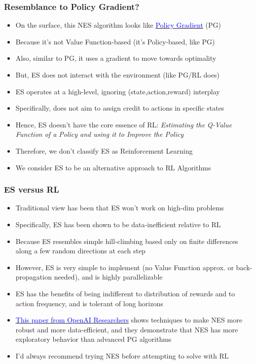 \documentclass[handout]{beamer}
\begin{document}
\begin{frame}
\frametitle{Resemblance to Policy Gradient?}
\begin{itemize}
\item On the surface, this NES algorithm looks like \href{https://github.com/coverdrive/technical-documents/blob/master/finance/cme241/PolicyGradient.pdf}{\underline{\textcolor{blue}{Policy Gradient}}} (PG)
\item Because it's not Value Function-based (it's Policy-based, like PG)
\item Also, similar to PG, it uses a gradient to move towards optimality
\item But, ES does not interact with the environment (like PG/RL does)
\item ES operates at a high-level, ignoring (state,action,reward) interplay
\item Specifically, does not aim to assign credit to actions in specific states
\item Hence, ES doesn't have the core essence of RL: {\em Estimating the Q-Value Function of a Policy and using it to Improve the Policy}
\item Therefore, we don't classify ES as Reinforcement Learning
\item We consider ES to be an alternative approach to RL Algorithms
\end{itemize}
\end{frame}

\begin{frame}
\frametitle{ES versus RL}
\begin{itemize}
\item Traditional view has been that ES won't work on high-dim problems
\item Specifically, ES has been shown to be data-inefficient relative to RL
\item Because ES resembles simple hill-climbing based only on finite differences along a few random directions at each step
\item However, ES is very simple to implement (no Value Function approx. or back-propagation needed), and is highly parallelizable
\item ES has the benefits of being indifferent to distribution of rewards and to action frequency, and is tolerant of long horizons
\item \href{https://arxiv.org/pdf/1703.03864.pdf}{\underline{\textcolor{blue}{This paper from OpenAI Researchers}}} shows techniques to make NES more robust and more data-efficient, and they demonstrate that NES has more exploratory behavior than advanced PG algorithms
\item I'd always recommend trying NES before attempting to solve with RL
\end{itemize}
\end{frame}
\end{document}
